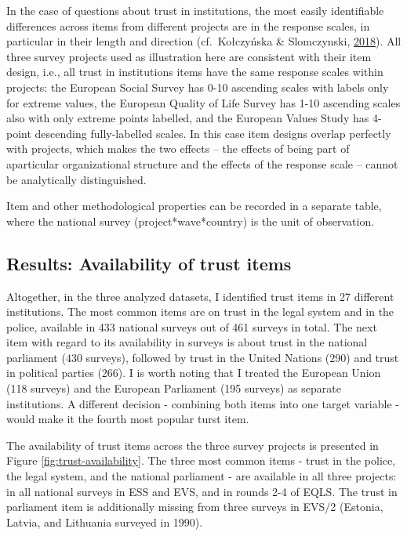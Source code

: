 \documentclass[12pt,]{article}
\begin{document}
In the case of questions about trust in institutions, the most easily identifiable differences across items from different projects are in the response scales, in particular in their length and direction (cf.~Kołczyńska \& Slomczynski, \protect\hyperlink{ref-KolczynskaSlomczynski2018}{2018}). All three survey projects used as illustration here are consistent with their item design, i.e., all trust in institutions items have the same response scales within projects: the European Social Survey has 0-10 ascending scales with labels only for extreme values, the European Quality of Life Survey has 1-10 ascending scales also with only extreme points labelled, and the European Values Study has 4-point descending fully-labelled scales. In this case item designs overlap perfectly with projects, which makes the two effects -- the effects of being part of aparticular organizational structure and the effects of the response scale -- cannot be analytically distinguished.

Item and other methodological properties can be recorded in a separate table, where the national survey (project*wave*country) is the unit of observation.

\hypertarget{results-availability-of-trust-items}{%
\subsection{Results: Availability of trust items}\label{results-availability-of-trust-items}}

Altogether, in the three analyzed datasets, I identified trust items in 27 different institutions. The most common items are on trust in the legal system and in the police, available in 433 national surveys out of 461 surveys in total. The next item with regard to its availability in surveys is about trust in the national parliament (430 surveys), followed by trust in the United Nations (290) and trust in political parties (266). I is worth noting that I treated the European Union (118 surveys) and the European Parliament (195 surveys) as separate institutions. A different decision - combining both items into one target variable - would make it the fourth most popular turst item.

The availability of trust items across the three survey projects is presented in Figure \ref{fig:trust-availability}. The three most common items - trust in the police, the legal system, and the national parliament - are available in all three projects: in all national surveys in ESS and EVS, and in rounds 2-4 of EQLS. The trust in parliament item is additionally missing from three surveys in EVS/2 (Estonia, Latvia, and Lithuania surveyed in 1990).
\end{document}
